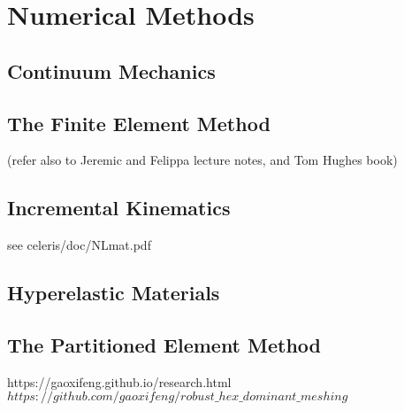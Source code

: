 \chapter{Numerical Methods}
%


\section{Continuum Mechanics}
\label{Continuum Mechanics}
\section{The Finite Element Method}
\label{The Finite Element Method}
(refer also to Jeremic and Felippa lecture notes, and Tom Hughes book)
\section{Incremental Kinematics}
\label{Incremental Kinematics}
see celeris/doc/NLmat.pdf
\section{Hyperelastic Materials}
\label{Hyperelastic Materials}
\section{The Partitioned Element Method}
\label{The Partitioned Element Method}

{https://gaoxifeng.github.io/research.html} ${https://github.com/gaoxifeng/robust\_hex\_dominant\_meshing}$
